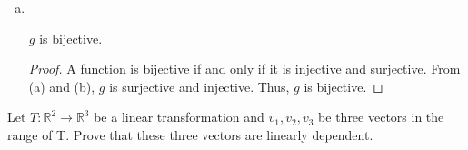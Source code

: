 \documentclass[11pt]{scrartcl}
\theoremstyle{dotlessP}
\theoremstyle{dotlessN}
\newcommand{\reals}{\mathbb{R}} %
\newcommand{\ints}{\mathbb{Z}}
\begin{document}
\begin{enumerate}[(a)]
\begin{proof}
		We verify that, when  $x_1 \geq 0$ and $x_2 < 0$, $g(x_1) \neq g(x_2)$. When  $x_1 \geq 0$, $g(x_1) = 2x_1 + 1$. When $x_2 < 0$, $g(x_2) = -2x_2$.
		\begin{align*}
			2x_1 + 1 &\stackrel{?}{=} -2x_2 \\
			2x_1 + 2x_2 &\stackrel{?}{=} -1 \\
			x_1 + x_2 &\stackrel{?}{=} -\frac{1}{2}
		\end{align*}
		As $x_1, x_2 \in \ints$, $x_1 + x_2 \neq -\displaystyle\frac{1}{2}$, and thus it is never the case that $g(x_1) = g(x_2)$ when $x_1 \geq 0$ and $x_2 < 0$. A symmetrical argument can be made for when $x_1 < 0$ and $x_2 \geq 0$.
		\\

		We will now examine two cases:
		\begin{enumerate}[(i)]
			\item $x_1 \geq 0$ and $x_2 \geq 0$. Then, $g(x_1) = 2x_1 + 1$ and $g(x_2) = 2x_2 + 1$. If $g(x_1) = g(x_2)$, then:
				\begin{align*}
					2x_1 + 1 &= 2x_2 + 1 \\
					2x_1 &= 2x_2 \\
					x_1 &= x_2
		        \end{align*}
			\item $x_1 < 0$ and $x_2 < 0$. Then, $g(x_1) = -2x_1$ and $g(x_2) = -2x_2$. If $g(x_1) = g(x_2)$, then:
				\begin{align*}
					-2x_1 &= -2x_2 \\
					x_1 &= x_2
				\end{align*}
		\end{enumerate}
		As we have shown that for all $x_1, x_2  \in \ints$, if $g(x_1) = g(x_2)$, then $x_1 = x_2$, we can conclude that $g$ is injective and the proof is complete.
		\end{proof}
	\item \
		\begin{claim*}
			$g$ is bijective.
		\end{claim*}
		\begin{proof}
			A function is bijective if and only if it is injective and surjective. From (a) and (b),  $g$ is surjective and injective. Thus, $g$ is bijective.
		\end{proof}
	\end{enumerate}
\begin{ques}
	Let $T: \reals^2 \to \mathbb{R}^3$ be a linear transformation and $v_1,v_2,v_3$ be three vectors in the range of T. Prove that these three vectors are linearly dependent.
\end{ques}
\end{document}

